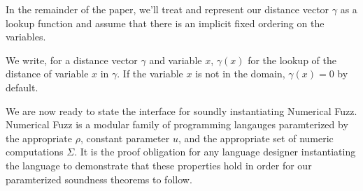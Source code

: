 In the remainder of the paper, we'll treat and represent our distance vector
$\gamma$ as a lookup function and assume that there is an implicit fixed
ordering on the variables.
\begin{definition}
  We write, for a distance vector $\gamma$ and variable $x$, $\gamma(x)$ for the
  lookup of the distance of variable $x$ in $\gamma$. If the variable $x$ is not
  in the domain, $\gamma(x) = 0$ by default. 
\end{definition}

We are now ready to state the interface for soundly instantiating Numerical
Fuzz. Numerical Fuzz is a modular family of programming langauges paramterized
by the appropriate $\rho$, constant parameter $u$, and the appropriate set of
numeric computations $\Sigma$.  
It is the proof obligation for any language designer instantiating the language
to demonstrate that these properties hold in order for our paramterized
soundness theorems to follow.
